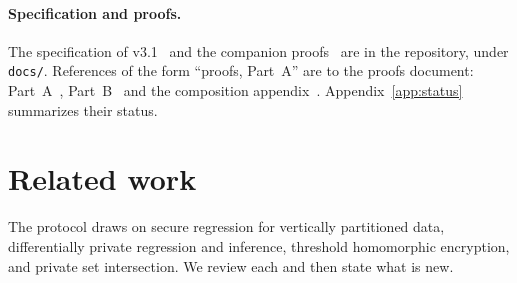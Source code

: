 \documentclass[11pt]{article}
\newif\ifshowchecks
\newcounter{checkitem}
\newcommand{\tocheck}[1]{%
  \ifshowchecks
    \refstepcounter{checkitem}%
    \addcontentsline{loc}{checkitem}{\protect\numberline{\thecheckitem}#1}%
    {\color{red!65!black}\sffamily\small[\textbf{Check~\thecheckitem:} #1]}%
  \fi}
\theoremstyle{definition}
\theoremstyle{plain}
\begin{document}
\paragraph{Specification and proofs.} The specification of v3.1~\cite{vfrspec} and the companion proofs~\cite{vfrproofs} are in the repository, under \texttt{docs/}. References of the form ``proofs, Part~A'' are to the proofs document: Part~A~\cite{vfrproofsA}, Part~B~\cite{vfrproofsB} and the composition appendix~\cite{vfrproofsC}. Appendix~\ref{app:status} summarizes their status.

\section{Related work}
\label{sec:related}

\tocheck{The bibliographic details of the entries cited in this section are taken from the literature review's verified reference list, and the fields that list omits (some given names, volumes and pages) are omitted here too. Three are still unverified. (a) UnLynx~\cite{froelicher2017unlynx} is not in the verified list. Its authors, title, issue, pages and DOI were confirmed only through a search-engine summary of the PoPETs page, and the description of its noise protocol comes from the Drynx paper, through search-engine extracts; check it against the UnLynx text. (b) Ion et al.~\cite{ion2020deploying} is not in the verified list. The title of ePrint 2019/723 and its nine-author list conflict with Google Research's listing of the EuroS\&P~2020 paper, which has a different title and six authors; the bibliography gives the ePrint title and the first two authors only. Confirm the published title, the authors and the pages ($370$--$389$). (c) The later title and the venue of Hwang et al.~\cite{hwang2025insecurity}: see Check~(T1) in Section~\ref{sec:privacy:mech}.}

The protocol draws on secure regression for vertically partitioned data, differentially private regression and inference, threshold homomorphic encryption, and private set intersection. We review each and then state what is new.
\end{document}
